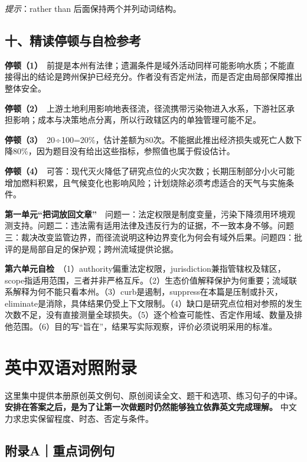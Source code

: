\documentclass[a4paper,11pt,openany]{report}
\begin{document}
\emph{提示}：rather than 后面保持两个并列动词结构。

\section{十、精读停顿与自检参考}\label{ux5341ux7cbeux8bfbux505cux987fux4e0eux81eaux68c0ux53c2ux8003}

\textbf{停顿（1）}　前提是本州有法律；遗漏条件是域外活动同样可能影响水质；不能直接得出的结论是跨州保护已经充分。作者没有否定州法，而是否定由局部保障推出整体安全。

\textbf{停顿（2）}　上游土地利用影响地表径流，径流携带污染物进入水系，下游社区承担影响；成本与决策地点分离，所以行政辖区内的单独管理可能不足。

\textbf{停顿（3）}　20÷100=20\%，估计差额为80次。不能据此推出经济损失或死亡人数下降80\%，因为题目没有给出这些指标，参照值也属于假设估计。

\textbf{停顿（4）}　可答：现代灭火降低了研究点位的火灾次数；长期压制部分小火可能增加燃料积累，且气候变化也影响风险；计划烧除必须考虑适合的天气与实施条件。

\textbf{第一单元``把词放回文章''}　问题一：法定权限是制度变量，污染下降须用环境观测支持。问题二：违法需有适用法律及违反行为的证据，不一致本身不够。问题三：裁决改变监管边界，而径流说明这种边界变化为何会有域外后果。问题四：批评的是局部自足的保护观；跨州流域提供论据。

\textbf{第六单元自检}　（1）authority偏重法定权限，jurisdiction兼指管辖权及辖区，scope指适用范围，三者并非严格互斥。（2）生态价值解释保护为何重要；流域联系解释为何不能只看本州。（3）curb是遏制，suppress在本篇是压制或扑灭，eliminate是消除，具体结果仍受上下文限制。（4）缺口是研究点位相对参照的发生次数不足，没有直接测量全球损失。（5）逐个检查可能性、否定作用域、数量及排他范围。（6）目的写``旨在''，结果写实际观察，评价必须说明采用的标准。

\chapter{英中双语对照附录}\label{ux82f1ux4e2dux53ccux8bedux5bf9ux7167ux9644ux5f55}

这里集中提供本册原创英文例句、原创阅读全文、题干和选项、练习句子的中译。\textbf{安排在答案之后，是为了让第一次做题时仍然能够独立依靠英文完成理解。} 中文力求忠实保留程度、时态、否定与条件。

\section{附录A｜重点词例句}\label{ux9644ux5f55aux91cdux70b9ux8bcdux4f8bux53e5}
\end{document}
